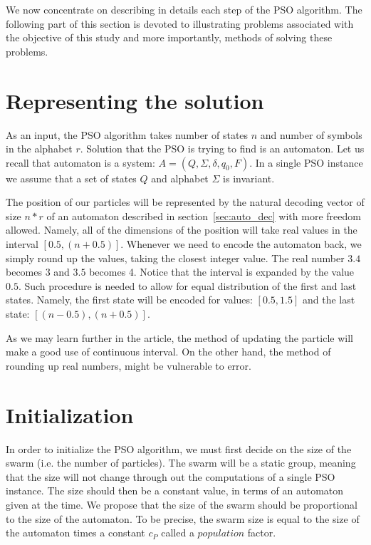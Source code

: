 \documentclass{mini}
\begin{document}
We now concentrate on describing in details each step of the PSO algorithm. The following part of this section is devoted to illustrating problems associated with the objective of this study and more importantly, methods of solving these problems.


\section{Representing the solution}
As an input, the PSO algorithm takes number of states $n$ and number of symbols in the alphabet $r$.
Solution that the PSO is trying to find is an automaton. Let us recall that automaton is a system: $A = (Q, \Sigma, \delta, q_0, F)$. In a single PSO instance we assume that a set of states $Q$ and alphabet $\Sigma$ is invariant. 

The position of our particles will be represented by the natural decoding vector of size $n*r$ of an automaton described in section~\ref{sec:auto_dec} with more freedom allowed. Namely, all of the dimensions of the position will take real values in the interval $[0.5, (n+0.5)]$. Whenever we need to encode the automaton back, we simply round up the values, taking the closest integer value. The real number $3.4$ becomes $3$ and $3.5$ becomes 4. Notice that the interval is expanded by the value $0.5$. Such procedure is needed to allow for equal distribution of the first and last states. Namely, the first state will be encoded for values: $[0.5, 1.5]$ and the last state: $[(n-0.5), (n+0.5)]$.

As we may learn further in the article, the method of updating the particle will make a good use of continuous interval. On the other hand, the method of rounding up real numbers, might be vulnerable to error.



\section{Initialization}
In order to initialize the PSO algorithm, we must first decide on the size of the swarm (i.e. the number of particles). The swarm will be a static group, meaning that the size will not change through out the computations of a single PSO instance. The size should then be a constant value, in terms of an automaton given at the time. We propose that the size of the swarm should be proportional to the size of the automaton. To be precise, the swarm size is equal to the size of the automaton times a constant $c_P$ called a $population$ factor.
\end{document}
